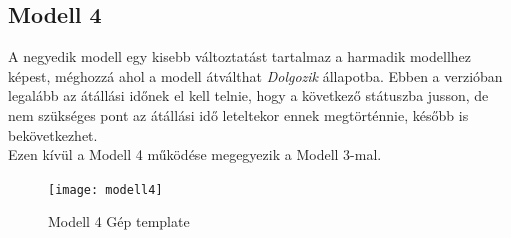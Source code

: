 \documentclass [12pt]{report}
\begin{document}
\subsection{Modell 4}
A negyedik modell egy kisebb változtatást tartalmaz a harmadik modellhez képest, méghozzá ahol a modell átválthat \emph{Dolgozik} állapotba. Ebben a verzióban legalább az átállási időnek el kell telnie, hogy a következő státuszba jusson, de nem szükséges pont az átállási idő leteltekor ennek megtörténnie, később is bekövetkezhet.\\
Ezen kívül a Modell 4 működése megegyezik a Modell 3-mal.
 \begin{figure}[htpb]
    \begin{center}
   \texttt{[image: modell4]}\\
    \caption{Modell 4 Gép template}
    \end{center}
    \end{figure}\\ 
 
\end{document}
